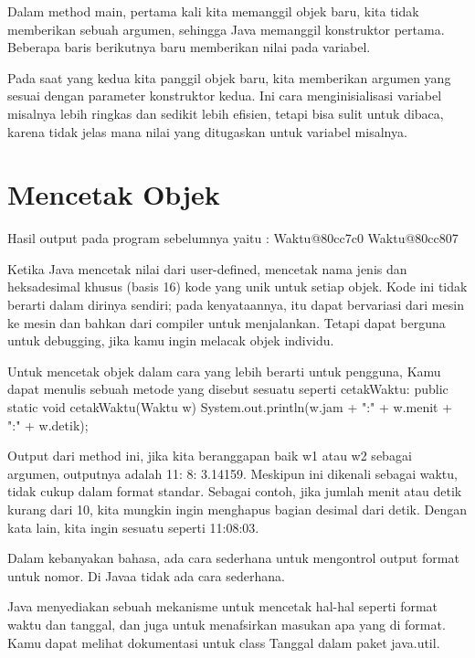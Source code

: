 Dalam method main, pertama kali kita memanggil objek baru, kita tidak memberikan sebuah argumen, sehingga Java memanggil konstruktor pertama. Beberapa baris berikutnya baru memberikan nilai pada variabel.

Pada saat yang kedua kita panggil objek baru, kita memberikan argumen yang sesuai dengan parameter konstruktor kedua. Ini cara menginisialisasi variabel misalnya lebih ringkas dan sedikit lebih efisien, tetapi bisa sulit untuk dibaca, karena tidak jelas mana nilai yang ditugaskan untuk variabel misalnya.

\section{Mencetak Objek}

Hasil output pada program sebelumnya yaitu :
\newline
Waktu@80cc7c0 \newline
Waktu@80cc807 \newline

Ketika Java mencetak nilai dari user-defined, mencetak nama jenis dan heksadesimal khusus (basis 16) kode yang unik untuk setiap objek. Kode ini tidak berarti dalam dirinya sendiri; pada kenyataannya, itu dapat bervariasi dari mesin ke mesin dan bahkan dari compiler untuk menjalankan. Tetapi dapat berguna untuk debugging, jika kamu ingin melacak objek individu.

Untuk mencetak objek dalam cara yang lebih berarti untuk pengguna, Kamu dapat menulis sebuah metode yang disebut sesuatu seperti cetakWaktu:
\newline
public static void cetakWaktu(Waktu w)\textbraceleft \newline
	System.out.println(w.jam + ":" + w.menit + ":" + w.detik); \newline
\textbraceright

Output dari method ini, jika kita beranggapan baik w1 atau w2 sebagai argumen, outputnya adalah 11: 8: 3.14159. Meskipun ini dikenali sebagai waktu, tidak cukup dalam format standar. Sebagai contoh, jika jumlah menit atau detik kurang dari 10, kita mungkin ingin menghapus bagian desimal dari detik. Dengan kata lain, kita ingin sesuatu seperti 11:08:03.

Dalam kebanyakan bahasa, ada cara sederhana untuk mengontrol output format untuk nomor. Di Javaa tidak ada cara sederhana.

Java menyediakan sebuah mekanisme untuk mencetak hal-hal seperti format waktu dan tanggal, dan juga untuk menafsirkan masukan apa yang di format. Kamu dapat melihat dokumentasi untuk class Tanggal dalam paket java.util.

